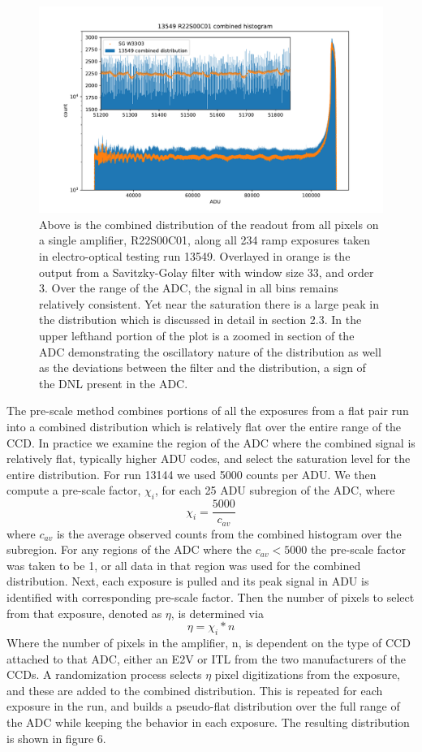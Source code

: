 \documentclass[11pt, letterpaper]{article}
\begin{document}
\begin{figure}
    \centering
    \includegraphics[width=0.5\linewidth]{bar13549.pdf}
    \caption{Above is the combined distribution of the readout from all pixels on a single amplifier, R22S00C01, along all 234 ramp exposures taken in electro-optical testing run 13549. Overlayed in orange is the output from a Savitzky-Golay filter with window size 33, and order 3. Over the range of the ADC, the signal in all bins remains relatively consistent. Yet near the saturation there is a large peak in the distribution which is discussed in detail in section 2.3. In the upper lefthand portion of the plot is a zoomed in section of the ADC demonstrating the oscillatory nature of the distribution as well as the deviations between the filter and the distribution, a sign of the DNL present in the ADC.}
    \label{fig:enter-label}
\end{figure}


The pre-scale method combines portions of all the exposures from a flat pair run into a combined distribution which is relatively flat over the entire range of the CCD. 
In practice we examine the region of the ADC where the combined signal is relatively flat, typically higher ADU codes, and select the saturation level for the entire distribution. 
For run 13144 we used 5000 counts per ADU. 
 We then compute a pre-scale factor, $\chi _i$, for each 25 ADU subregion of the ADC, where
\begin{equation}\label{}
\chi_i = \frac{5000}{c_{av}}
\end{equation}
where $c_{av}$ is the average observed counts from the combined histogram over the subregion. 
For any regions of the ADC where the $c_{av} < 5000$ the pre-scale factor was taken to be 1, or all data in that region was used for the combined distribution. 
Next, each exposure is pulled and its peak signal in ADU is identified with corresponding pre-scale factor. 
Then the number of pixels to select from that exposure, denoted as $\eta $, is determined via
 \begin{equation}\label{}
 \eta = \chi_i *n 
\end{equation}
Where the number of pixels in the amplifier, n, is dependent on the type of CCD attached to that ADC, either an E2V or ITL from the two manufacturers of the CCDs. 
A randomization process selects $\eta$ pixel digitizations from the exposure, and these are added to the combined distribution. 
This is repeated for each exposure in the run, and builds a pseudo-flat distribution over the full range of the ADC while keeping the behavior in each exposure. 
The resulting distribution is shown in figure 6. 
\end{document}
